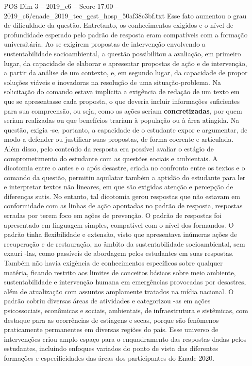 \begin{textsample}{POS Dim 3 – 2019\_c6 – Score 17.00 – 2019\_c6/enade\_2019\_tec\_gest\_hosp\_50af38c3bf.txt}
Esse fato aumentou o grau de dificuldade da questão.
Entretanto, os conhecimentos exigidos e o nível de profundidade esperado pelo padrão de resposta eram compatíveis com a formação universitária.
Ao se exigirem propostas de intervenção envolvendo a sustentabilidade socioambiental, a questão possibilitou a avaliação, em primeiro lugar, da capacidade de elaborar e apresentar propostas de ação e de intervenção, a partir da análise de um contexto, e, em segundo lugar, da capacidade de propor soluções viáveis e inovadoras na resolução de uma situação-problema.
Na solicitação do comando estava implícita a exigência de redação de um texto em que se apresentasse cada proposta, o que deveria incluir informações suficientes para sua compreensão, ou seja, como as ações seriam \textbf{concretizadas}, por quem seriam realizadas ou que benefícios trariam à população ou à área atingida.
Na questão, exigia -se, portanto, a capacidade de o estudante expor e argumentar, de modo a defender ou justificar suas propostas, de forma coerente e articulada.
Além disso, pelo conteúdo da resposta era possível avaliar o estágio de comprometimento do estudante com as questões sociais e ambientais.
A dicotomia entre o antes e o após desastre, criada no confronto entre os textos e o comando da questão, permitiu aquilatar também a aptidão do estudante para ler e interpretar textos não lineares, em que são exigidas atenção e percepção de diferenças sutis.
No entanto, tal dicotomia gerou respostas que não estavam em conformidade com as linhas de ação apontadas no padrão de resposta, respostas erradas por terem foco em ações de prevenção.
O padrão de respostas foi apresentado em linguagem simples, compatível com o nível dos formandos.
O padrão tinha flexibilidade e extensão, visto que apresentava inúmeras ações de recuperação e de restauração, no âmbito da sustentabilidade socioambiental, sem exauri -las, como passíveis de abordagem pelos estudantes em suas respostas.
Também não havia exigência de conhecimentos específicos sobre qualquer matéria, ficando restrito aos limites de conceitos básicos sobre meio ambiente, sustentabilidade e intervenção humana em emergências provocadas por desastres, além de atualização com assuntos amplamente tratados na mídia nacional.
O padrão cobriu diversas áreas de atividades e categorizou -as em ações psicossociais, econômicas e sociais, ambientais, de infraestrutura e sistêmicas, com destaque para as ocorrências de estiagens e secas, porque são fenômenos praticamente permanentes em diversas regiões do país.
Esse universo de intervenções criou amplo espaço para o enquadramento das respostas dadas pelos estudantes, incluindo enfoques variados do ponto de vista das diferentes formações e especificidades das áreas dos participantes do Enade 2020.

\end{textsample}
